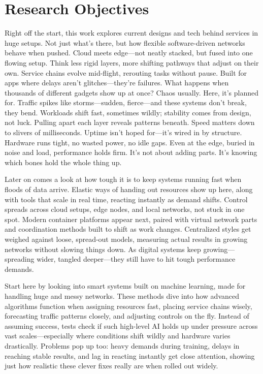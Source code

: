 \documentclass[a4paper,fleqn]{cas-dc}
\numberwithin{equation}{section}
\begin{document}
\section{Research Objectives}

Right off the start, this work explores current designs and tech behind services in huge setups. Not just what's there, but how flexible software-driven networks behave when pushed. Cloud meets edge—not neatly stacked, but fused into one flowing setup. Think less rigid layers, more shifting pathways that adjust on their own. Service chains evolve mid-flight, rerouting tasks without pause. Built for apps where delays aren't glitches—they're failures. What happens when thousands of different gadgets show up at once? Chaos usually. Here, it's planned for. Traffic spikes like storms—sudden, fierce—and these systems don't break, they bend. Workloads shift fast, sometimes wildly; stability comes from design, not luck. Pulling apart each layer reveals patterns beneath. Speed matters down to slivers of milliseconds. Uptime isn't hoped for—it's wired in by structure. Hardware runs tight, no wasted power, no idle gaps. Even at the edge, buried in noise and load, performance holds firm. It's not about adding parts. It's knowing which bones hold the whole thing up.

Later on comes a look at how tough it is to keep systems running fast when floods of data arrive. Elastic ways of handing out resources show up here, along with tools that scale in real time, reacting instantly as demand shifts. Control spreads across cloud setups, edge nodes, and local networks, not stuck in one spot. Modern container platforms appear next, paired with virtual network parts and coordination methods built to shift as work changes. Centralized styles get weighed against loose, spread-out models, measuring actual results in growing networks without slowing things down. As digital systems keep growing—spreading wider, tangled deeper—they still have to hit tough performance demands.

Start here by looking into smart systems built on machine learning, made for handling huge and messy networks. These methods dive into how advanced algorithms function when assigning resources fast, placing service chains wisely, forecasting traffic patterns closely, and adjusting controls on the fly. Instead of assuming success, tests check if such high-level AI holds up under pressure across vast scales—especially where conditions shift wildly and hardware varies drastically. Problems pop up too: heavy demands during training, delays in reaching stable results, and lag in reacting instantly get close attention, showing just how realistic these clever fixes really are when rolled out widely.
\end{document}

